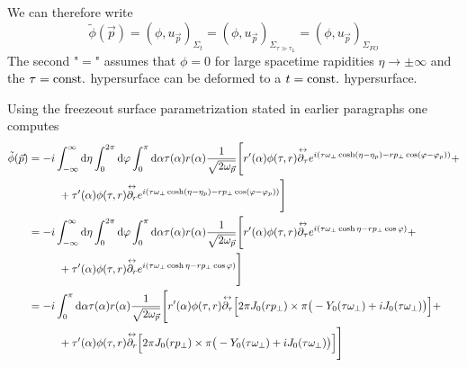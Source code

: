 We can therefore write
\begin{equation}
    \tilde{\phi}(\vec{p})=(\phi,u_{\vec{p}})_{\Sigma_t}=(\phi,u_{\vec{p}})_{\Sigma_{\tau\gg\tau_L}}=(\phi,u_{\vec{p}})_{\Sigma_{FO}}
\end{equation}
The second "$=$" assumes that $\phi=0$ for large spacetime rapidities $\eta\to\pm\infty$ and the $\tau={\text{const.}}$ hypersurface can be deformed to a $t={\text{const.}}$ hypersurface.

Using the freezeout surface parametrization stated in earlier paragraphs one computes 
\begin{subequations}
    \begin{align}
        \tilde{\phi}(\vec{p}) & =-\imagu\int_{-\infty}^\infty\dt\eta\int_0^{2\pi}\dt\varphi\int_0^\pi\dt\alpha\tau(\alpha) r(\alpha)\frac{1}{\sqrt{2\omega_{\vec{p}}}}\Bigg[r^\prime(\alpha)\phi(\tau,r)\overset{\leftrightarrow}{\partial_\tau}e^{\imagu(\tau \omega_\perp\cosh(\eta-\eta_p)-r p_\perp\cos(\varphi-\varphi_p))}+\nonumber \\
                              & \phantom{=}\qquad + \tau^\prime(\alpha)\phi(\tau,r)\overset{\leftrightarrow}{\partial_r}e^{\imagu(\tau \omega_\perp\cosh(\eta-\eta_p)-r p_\perp\cos(\varphi-\varphi_p))}\Bigg]                                                                                                                             \\
                              & =-\imagu\int_{-\infty}^\infty\dt\eta\int_0^{2\pi}\dt\varphi\int_0^\pi\dt\alpha\tau(\alpha) r(\alpha)\frac{1}{\sqrt{2\omega_{\vec{p}}}}\Bigg[r^\prime(\alpha)\phi(\tau,r)\overset{\leftrightarrow}{\partial_\tau}e^{\imagu(\tau \omega_\perp\cosh\eta-r p_\perp\cos\varphi)}+\nonumber                      \\
                              & \phantom{=}\qquad + \tau^\prime(\alpha)\phi(\tau,r)\overset{\leftrightarrow}{\partial_r}e^{\imagu(\tau \omega_\perp\cosh\eta-r p_\perp\cos\varphi)}\Bigg]                                                                                                                                                  \\
                              & =-\imagu\int_0^\pi\dt\alpha\tau(\alpha) r(\alpha)\frac{1}{\sqrt{2\omega_{\vec{p}}}}\Bigg[r^\prime(\alpha)\phi(\tau,r)\overset{\leftrightarrow}{\partial_\tau}\Big[2\pi J_0(r p_\perp)\times\pi\big(-Y_0(\tau\omega_\perp)+\imagu J_0(\tau\omega_\perp)\big)\Big]+\nonumber                                 \\
                              & \phantom{=}\qquad + \tau^\prime(\alpha)\phi(\tau,r)\overset{\leftrightarrow}{\partial_r}\Big[2\pi J_0(r p_\perp)\times\pi\big(-Y_0(\tau\omega_\perp)+\imagu J_0(\tau\omega_\perp)\big)\Big]\Bigg]                                                                                                          \\

\end{align}
\end{subequations}

